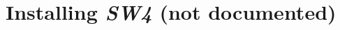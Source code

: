 \documentclass[11pt]{report}
\begin{document}




\appendix
\chapter{Installing \emph{SW4} (not documented)}\label{cha:installing-sw4}

\end{document}
